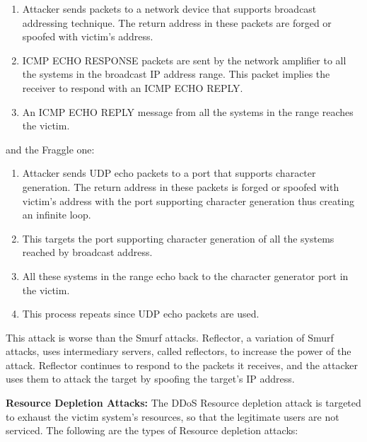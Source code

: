 \documentclass{ijitcs}
\begin{document}
\begin{itemize}
    \begin{enumerate}
        \item Attacker sends packets to a network device that supports broadcast addressing technique. The return address in these packets are forged or spoofed with victim’s address.
        \item ICMP ECHO RESPONSE packets are sent by the network amplifier to all the systems in the broadcast IP address range. This packet implies the receiver to respond with an ICMP ECHO REPLY.
        \item An ICMP ECHO REPLY message from all the systems in the range reaches the victim.
    \end{enumerate}
    and the Fraggle one\cite{deshmukh2015understanding}:
    \begin{enumerate}
        \item Attacker sends UDP echo packets to a port that supports character generation. The return address in these packets is forged or spoofed with victim’s address with the port supporting character generation thus creating an infinite loop.
        \item This targets the port supporting character generation of all the systems reached by broadcast address.
        \item All these systems in the range echo back to the character generator port in the victim.
        \item This process repeats since UDP echo packets are used.
    \end{enumerate}
    This attack is worse than the Smurf attacks. Reflector, a variation of Smurf attacks, uses intermediary servers, called reflectors, to increase the power of the attack. Reflector continues to respond to the packets it receives, and the attacker uses them to attack the target by spoofing the target's IP address.
\end{itemize}
\textbf{Resource Depletion Attacks:} The DDoS Resource depletion attack is targeted to exhaust the victim system’s resources, so that the legitimate users are not serviced. The following are the types of Resource depletion attacks:
\end{document}

